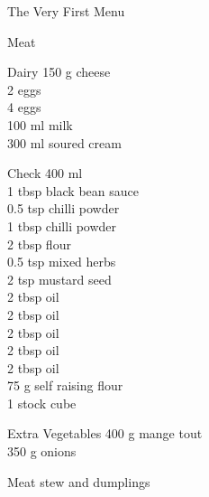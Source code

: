 \begin{menu}{The Very First Menu}
\begin{shoppinglist}{Meat}
      \end{shoppinglist}%
      \begin{shoppinglist}{Dairy}
      150 g cheese \\ 
      2  eggs \\ 
      4  eggs \\ 
      100 ml milk \\ 
      300 ml soured cream \\ 
      \end{shoppinglist}%
      \par\vfil %
      \vfil\clearpage %
      \begin{shoppinglist}{Check}
      400 ml  \\ 
      1 tbsp black bean sauce \\ 
      0.5 tsp chilli powder \\ 
      1 tbsp chilli powder \\ 
      2 tbsp flour \\ 
      0.5 tsp mixed herbs \\ 
      2 tsp mustard seed \\ 
      2 tbsp oil \\ 
      2 tbsp oil \\ 
      2 tbsp oil \\ 
      2 tbsp oil \\ 
      2 tbsp oil \\ 
      75 g self raising flour \\ 
      1  stock cube \\ 
      \end{shoppinglist}%
      \begin{shoppinglist}{Extra Vegetables}
      400 g mange tout \\ 
      350 g onions \\ 
      \end{shoppinglist}%
      \par\vfil %
    \vfil\clearpage
  
    \begin{recipe}{2}{Meat stew and dumplings}%
    
	
	

\end{recipe}
\end{menu}
